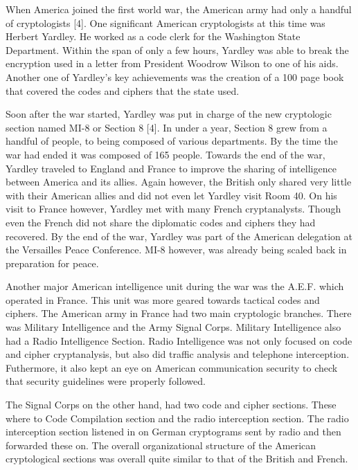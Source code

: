 \documentclass{article}
\begin{document}
    When America joined the first world war, the American army had only a handful of
    cryptologists [4].
    One significant American cryptologists at this time was Herbert Yardley.
    He worked as a code clerk for the Washington State Department.
    Within the span of only a few hours, Yardley was able to break the encryption
    used in a letter from President Woodrow Wilson to one of his aids.
    Another one of Yardley's key achievements was the creation of a 100 page book
    that covered the codes and ciphers that the state used.

    Soon after the war started, Yardley was put in charge of the new cryptologic section
    named MI-8 or Section 8 [4]. In under a year, Section 8 grew from a handful of people,
    to being composed of various departments. By the time the war had ended
    it was composed of 165 people.
    Towards the end of the war, Yardley traveled to England and France to improve
    the sharing of intelligence between America and its allies.
    Again however, the British only shared very little with their American allies and did
    not even let Yardley visit Room 40.
    On his visit to France however, Yardley met with many French cryptanalysts.
    Though even the French did not share the diplomatic codes and ciphers they had recovered.
    By the end of the war, Yardley was part of the American delegation at
    the Versailles Peace Conference. MI-8 however, was already being scaled back
    in preparation for peace.

    Another major American intelligence unit during the war was the A.E.F. which
    operated in France. This unit was more geared towards tactical codes and ciphers.
    The American army in France had two main cryptologic branches.
    There was Military Intelligence and the Army Signal Corps.
    Military Intelligence also had a Radio Intelligence Section. Radio Intelligence
    was not only focused on code and cipher cryptanalysis, but also did traffic
    analysis and telephone interception. Futhermore, it also kept an eye on American
    communication security to check that security guidelines were properly followed.

    The Signal Corps on the other hand, had two code and cipher sections. These
    where to Code Compilation section and the radio interception section.
    The radio interception section listened in on German cryptograms sent by radio
    and then forwarded these on.
    The overall organizational structure of the American cryptological sections
    was overall quite similar to that of the British and French.
\end{document}

